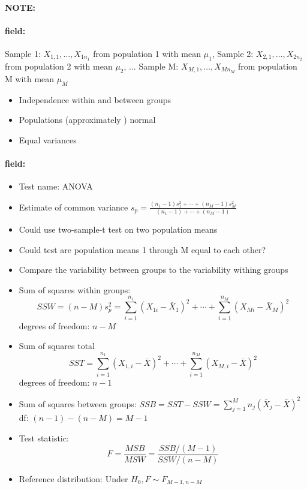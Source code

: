 \documentclass[12pt]{article}
\newenvironment{note}{\paragraph{NOTE:}}{}
\newenvironment{field}{\paragraph{field:}}{}
\begin{document}
\begin{note}
 \begin{field}
  Sample 1: $X_{1,1}, \ldots , X_{1n_1}$ from population 1 with mean $\mu_1$, Sample 2: $X_{2,1}, \ldots , X_{2n_2}$ from population 2 with mean $\mu_2$, $\ldots $ Sample M: $X_{M,1}, \ldots , X_{Mn_M}$ from population M with mean $\mu_M$
  \begin{itemize}
   \item Independence within and between groups
   \item Populations (approximately ) normal
   \item Equal variances
  \end{itemize}
 \end{field}
 \begin{field}
  \begin{itemize}
   \item Test name: ANOVA
   \item Estimate of common variance $s_p = \frac{(n_1-1)s_1^2 + \cdots + (n_M -1)s_M^2}{(n_1-1) + \cdots + (n_M-1)}$
   \item Could use two-sample-t test on two population means
   \item Could test are population means 1 through M equal to each other?
   \item Compare the variability between groups to the variability withing groups
   \item Sum of squares within groups:
         $$ SSW = (n-M)s_p^2  = \sum_{i=1}^{n_1}(X_{1i} - \bar{X}_1)^2 + \cdots +  \sum_{i=1}^{n_M}(X_{Mi} - \bar{X}_M)^2$$
         degrees of freedom: $n-M$
   \item Sum of squares total
         $$ SST  = \sum_{i=1}^{n_1}(X_{1,i} - \bar{X})^2 + \cdots + \sum_{i=1}^{n_M} (X_{M,i} - \bar{X})^2$$
         degrees of freedom: $n-1$
   \item Sum of squares between groups: $ SSB = SST - SSW = \sum_{j=1}^Mn_j(\bar{X}_j - \bar{X})^2$ df: $(n-1) - (n-M) = M-1$
   \item Test statistic: $$ F = \frac{MSB}{MSW} = \frac{SSB/(M-1)}{SSW/(n-M)} $$
   \item Reference distribution: Under $H_0, F \sim F_{M-1, n-M}$
  \end{itemize}
 \end{field}
\end{note}


\end{document}
